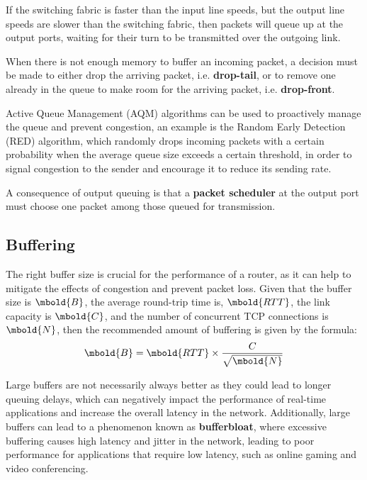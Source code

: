 \documentclass[12pt letter]{report}
\begin{document}
If the switching fabric is faster than the input line speeds, but the
output line speeds are slower than the switching fabric, then packets
will queue up at the output ports, waiting for their turn to be
transmitted over the outgoing link.



When there is not enough memory to buffer an incoming packet, a
decision must be made to either drop the arriving packet, i.e.
\textbf{drop-tail}, or to remove one already in the queue to make
room for the arriving packet, i.e. \textbf{drop-front}.

Active Queue Management (AQM) algorithms can be used to proactively
manage the queue and prevent congestion, an example is the Random
Early Detection (RED) algorithm, which randomly drops incoming
packets with a certain probability when the average queue size
exceeds a certain threshold, in order to signal congestion to the
sender and encourage it to reduce its sending rate.

A consequence of output queuing is that a \textbf{packet scheduler}
at the output port must choose one packet among those queued for transmission.

\subsection{Buffering}

The right buffer size is crucial for the performance of a router, as
it can help to mitigate the effects of congestion and prevent packet
loss. Given that
the buffer size is $\mbold{B}$, the average round-trip time is,
$\mbold{RTT}$, the link capacity is $\mbold{C}$, and the number of
concurrent TCP connections is $\mbold{N}$, then the recommended
amount of buffering is given by the formula:
\[
  \mbold{B} = \mbold{RTT} \times \frac{C}{\sqrt{\mbold{N}} }
\]

Large buffers are not necessarily always better as they could lead to
longer queuing delays, which can negatively impact the performance of
real-time applications and increase the overall latency in the
network. Additionally, large buffers can lead to a phenomenon known
as \textbf{bufferbloat}, where excessive buffering causes high
latency and jitter in the network, leading to poor performance for
applications that require low latency, such as online gaming and
video conferencing.
\end{document}
